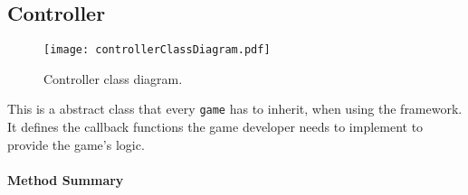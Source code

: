\subsection{Controller}

\begin{figure}[h]
	\centering
	\texttt{[image: controllerClassDiagram.pdf]}
	\caption{Controller class diagram.}
	\label{img:controllerClassDiagram}
\end{figure}

\pagebreak

This is a abstract class that every \texttt{game} has to inherit, when using the \graphioli framework. It defines the callback functions the game developer needs to implement to provide the game's logic. \\


\centerdash

\paragraph*{Method Summary}
